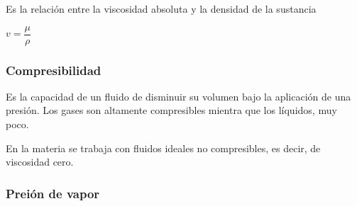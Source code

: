 Es la relación entre la viscosidad absoluta y la densidad de la sustancia
\begin{center}
	$v = \dfrac{\mu}{\rho}$
\end{center}

\subsubsection{Compresibilidad}
Es la capacidad de un fluido de disminuir su volumen bajo la aplicación de una presión. Los gases son altamente compresibles mientra que los líquidos, muy poco. 

En la materia \materia se trabaja con fluidos ideales no compresibles, es decir, de viscosidad cero.

\subsubsection{Preión de vapor}
